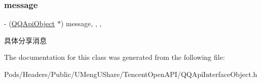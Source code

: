 \subsubsection{\texorpdfstring{message}{message}}
{\footnotesize\ttfamily -\/ (\mbox{\hyperlink{interface_q_q_api_object}{Q\+Q\+Api\+Object}} $\ast$) message\hspace{0.3cm}{\ttfamily [read]}, {\ttfamily [write]}, {\ttfamily [nonatomic]}, {\ttfamily [retain]}}

具体分享消息 

The documentation for this class was generated from the following file\+:\begin{DoxyCompactItemize}
\item 
Pods/\+Headers/\+Public/\+U\+Meng\+U\+Share/\+Tencent\+Open\+A\+P\+I/Q\+Q\+Api\+Interface\+Object.\+h\end{DoxyCompactItemize}
